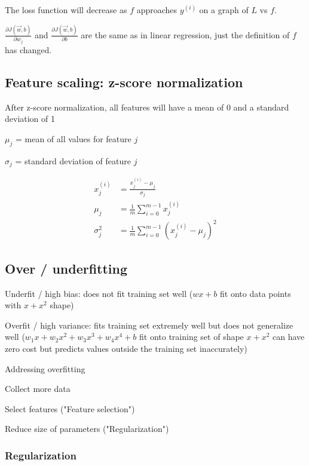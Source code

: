 \documentclass[12pt]{article}
\begin{document}
The loss function will decrease as $f$ approaches $y^{(i)}$ on a graph of $L$ vs $f$.

$\frac{\partial J(\vec{w},b)}{\partial w_j}$ and $\frac{\partial J(\vec{w},b)}{\partial b}$ are the same as in linear regression, just the definition of $f$ has changed.

\subsection{Feature scaling: z-score normalization}

After z-score normalization, all features will have a mean of 0 and a standard deviation of 1

$\mu_j$ = mean of all values for feature $j$

$\sigma_j$ = standard deviation of feature $j$

\begin{align*}
x_j^{(i)} &= \frac{x_j^{(i)} - \mu_j}{\sigma_j}\\
\mu_j &= \frac{1}{m} \sum_{i=0}^{m-1} x_j^{(i)}\\
\sigma_j^2 &= \frac{1}{m} \sum_{i=0}^{m-1} (x_j^{(i)} - \mu_j)^2
\end{align*}

\subsection{Over / underfitting}

Underfit / high bias: does not fit training set well ($wx + b$ fit onto data points with $x + x^2$ shape)

Overfit / high variance: fits training set extremely well but does not generalize well ($w_1 x + w_2 x^2 + w_3 x^3 + w_4 x^4 + b$ fit onto training set of shape $x + x^2$ can have zero cost but predicts values outside the training set inaccurately)

\vspace{5px}

Addressing overfitting
\begin{myitemize}
	\item Collect more data
	\item Select features ("Feature selection")
	\item Reduce size of parameters ("Regularization")
\end{myitemize}

\subsubsection{Regularization}
\end{document}
